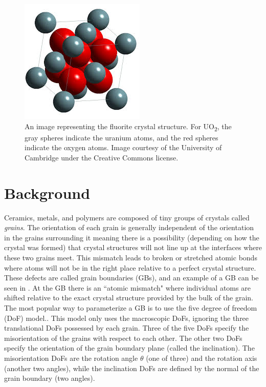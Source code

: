 \documentclass[12pt]{report}
\begin{document}
\begin{figure}[ht!]
\centering
\includegraphics[scale=1.0]{Images/UO2}
\caption{\label{fig:uo2Lattice}An image representing the fluorite crystal structure.  For UO\textsubscript{2}, the gray spheres indicate the uranium atoms, and the red spheres indicate the oxygen atoms.  Image courtesy of the University of Cambridge under the Creative Commons license.}
\end{figure}

\section{Background}
Ceramics, metals, and polymers are composed of tiny groups of crystals called \emph{grains}.  The orientation of each grain is generally independent of the orientation in the grains surrounding it meaning there is a possibility (depending on how the crystal was formed\cite{callister2003}) that crystal structures will not line up at the interfaces where these two grains meet.  This mismatch leads to broken or stretched atomic bonds where atoms will not be in the right place relative to a perfect crystal structure.  These defects are called grain boundaries (GBs), and an example of a GB can be seen in .  At the GB there is an ``atomic mismatch"\cite{callister2003} where individual atoms are shifted relative to the exact crystal structure provided by the bulk of the grain.  The most popular way to parameterize a GB is to use the five degree of freedom (DoF) model.\cite{patala2013, lejcek2010, homer2015, bulatov2014, harbison2015, rohrer2011}.  This model only uses the macroscopic DoFs, ignoring the three translational DoFs possessed by each grain.  Three of the five DoFs specify the misorientation of the grains with respect to each other.  The other two DoFs specify the orientation of the grain boundary plane (called the inclination).  The misorientation DoFs are the rotation angle $\theta$ (one of three) and the rotation axis (another two angles), while the inclination DoFs are defined by the normal of the grain boundary (two angles).\cite{lejcek2010}
\end{document}
